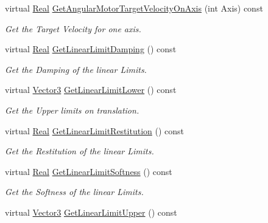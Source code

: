 \begin{DoxyCompactItemize}
virtual \hyperlink{namespacephys_af7eb897198d265b8e868f45240230d5f}{Real} \hyperlink{classphys_1_1Generic6DofConstraint_a1d6f93f892706cb58254e6f350dc1d7e}{GetAngularMotorTargetVelocityOnAxis} (int Axis) const 
\begin{DoxyCompactList}\small\item\em Get the Target Velocity for one axis. \item\end{DoxyCompactList}\item 
virtual \hyperlink{namespacephys_af7eb897198d265b8e868f45240230d5f}{Real} \hyperlink{classphys_1_1Generic6DofConstraint_a6b159d323fd3b2e82618e09c437de3f2}{GetLinearLimitDamping} () const 
\begin{DoxyCompactList}\small\item\em Get the Damping of the linear Limits. \item\end{DoxyCompactList}\item 
virtual \hyperlink{classphys_1_1Vector3}{Vector3} \hyperlink{classphys_1_1Generic6DofConstraint_acc19883e9b9e85853f6bae8a809c9304}{GetLinearLimitLower} () const 
\begin{DoxyCompactList}\small\item\em Get the Upper limits on translation. \item\end{DoxyCompactList}\item 
virtual \hyperlink{namespacephys_af7eb897198d265b8e868f45240230d5f}{Real} \hyperlink{classphys_1_1Generic6DofConstraint_a23ce9f9bbd72d125685569f6ae201250}{GetLinearLimitRestitution} () const 
\begin{DoxyCompactList}\small\item\em Get the Restitution of the linear Limits. \item\end{DoxyCompactList}\item 
virtual \hyperlink{namespacephys_af7eb897198d265b8e868f45240230d5f}{Real} \hyperlink{classphys_1_1Generic6DofConstraint_a43d58ae5b6993ee689e950d5291f6787}{GetLinearLimitSoftness} () const 
\begin{DoxyCompactList}\small\item\em Get the Softness of the linear Limits. \item\end{DoxyCompactList}\item 
virtual \hyperlink{classphys_1_1Vector3}{Vector3} \hyperlink{classphys_1_1Generic6DofConstraint_a9f570d84877b3585f15dac4bb87448e9}{GetLinearLimitUpper} () const 

\end{DoxyCompactItemize}
